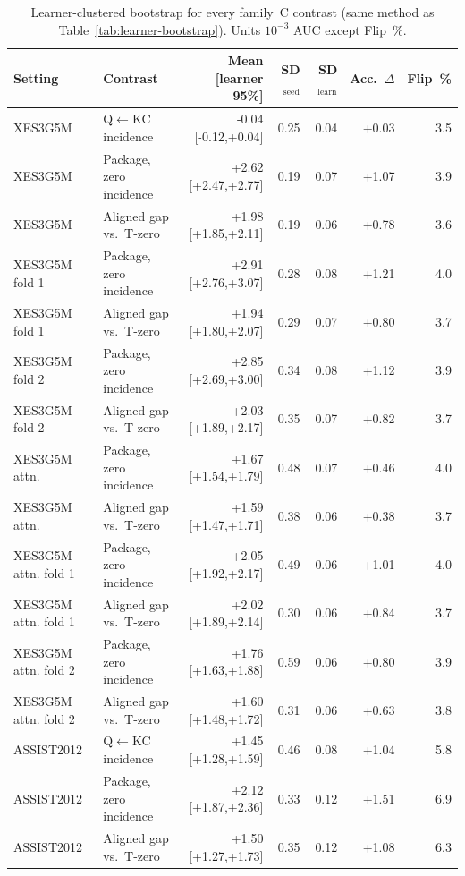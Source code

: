 \begin{table}[H]
\caption{Learner-clustered bootstrap for every family~C contrast
(same method as Table~\ref{tab:learner-bootstrap}). Units
$10^{-3}$ AUC except Flip~\%.}
\label{tab:learner-bootstrap-all}
\centering
\scriptsize
\setlength{\tabcolsep}{2.0pt}
\begin{tabular}{@{}llrrrrr@{}}
\toprule
Setting & Contrast & Mean [learner 95\%] & SD$_{\mathrm{seed}}$ & SD$_{\mathrm{learn}}$ & Acc.\ $\Delta$ & Flip~\% \\
\midrule
XES3G5M & Q$\leftarrow$KC incidence & -0.04 [-0.12,+0.04] & 0.25 & 0.04 & +0.03 & 3.5 \\
XES3G5M & Package, zero incidence & +2.62 [+2.47,+2.77] & 0.19 & 0.07 & +1.07 & 3.9 \\
XES3G5M & Aligned gap vs.\ T-zero & +1.98 [+1.85,+2.11] & 0.19 & 0.06 & +0.78 & 3.6 \\
XES3G5M fold 1 & Package, zero incidence & +2.91 [+2.76,+3.07] & 0.28 & 0.08 & +1.21 & 4.0 \\
XES3G5M fold 1 & Aligned gap vs.\ T-zero & +1.94 [+1.80,+2.07] & 0.29 & 0.07 & +0.80 & 3.7 \\
XES3G5M fold 2 & Package, zero incidence & +2.85 [+2.69,+3.00] & 0.34 & 0.08 & +1.12 & 3.9 \\
XES3G5M fold 2 & Aligned gap vs.\ T-zero & +2.03 [+1.89,+2.17] & 0.35 & 0.07 & +0.82 & 3.7 \\
XES3G5M attn. & Package, zero incidence & +1.67 [+1.54,+1.79] & 0.48 & 0.07 & +0.46 & 4.0 \\
XES3G5M attn. & Aligned gap vs.\ T-zero & +1.59 [+1.47,+1.71] & 0.38 & 0.06 & +0.38 & 3.7 \\
XES3G5M attn. fold 1 & Package, zero incidence & +2.05 [+1.92,+2.17] & 0.49 & 0.06 & +1.01 & 4.0 \\
XES3G5M attn. fold 1 & Aligned gap vs.\ T-zero & +2.02 [+1.89,+2.14] & 0.30 & 0.06 & +0.84 & 3.7 \\
XES3G5M attn. fold 2 & Package, zero incidence & +1.76 [+1.63,+1.88] & 0.59 & 0.06 & +0.80 & 3.9 \\
XES3G5M attn. fold 2 & Aligned gap vs.\ T-zero & +1.60 [+1.48,+1.72] & 0.31 & 0.06 & +0.63 & 3.8 \\
ASSIST2012 & Q$\leftarrow$KC incidence & +1.45 [+1.28,+1.59] & 0.46 & 0.08 & +1.04 & 5.8 \\
ASSIST2012 & Package, zero incidence & +2.12 [+1.87,+2.36] & 0.33 & 0.12 & +1.51 & 6.9 \\
ASSIST2012 & Aligned gap vs.\ T-zero & +1.50 [+1.27,+1.73] & 0.35 & 0.12 & +1.08 & 6.3 \\

\end{tabular}
\end{table}
